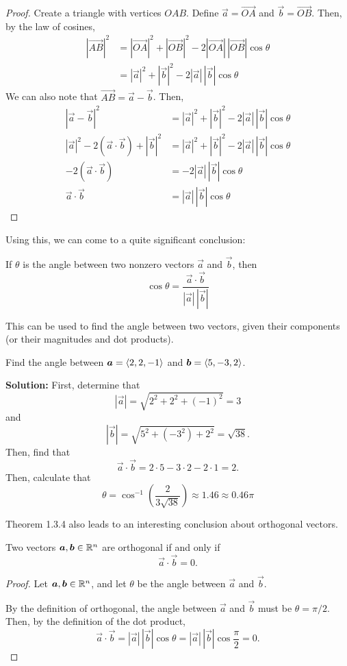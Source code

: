 \begin{proof}
    Create a triangle with vertices \(OAB\). Define \(\vec a = \overrightarrow{OA}\) and \(\vec b = \overrightarrow{OB}\). Then, by the law of cosines,
    \begin{align*}
        |\overrightarrow{AB}|^2 &= |\overrightarrow{OA}|^2+|\overrightarrow{OB}|^2-2|\overrightarrow{OA}|\,|\overrightarrow{OB}|\cos\theta \\
        &= |\vec a|^2 + |\vec b|^2 - 2|\vec a|\,|\vec b|\cos \theta
    \end{align*}
    We can also note that \(\overrightarrow{AB}=\vec a - \vec b\). Then,
    \begin{align*}
        |\vec a - \vec b|^2 &= |\vec a|^2 + |\vec b|^2 - 2|\vec a|\,|\vec b|\cos \theta \\
        |\vec a|^2 -2(\vec a \cdot \vec b)+|\vec b|^2 &= |\vec a|^2 + |\vec b|^2 - 2|\vec a|\,|\vec b|\cos \theta \\
        -2(\vec a \cdot \vec b) &= -2|\vec a|\,|\vec b|\cos \theta \\
        \vec a\cdot \vec b &= |\vec a|\,|\vec b|\cos\theta
    \end{align*}
\end{proof}
Using this, we can come to a quite significant conclusion:
\begin{corollary}
    If \(\theta\) is the angle between two nonzero vectors \(\vec a\) and \(\vec b\), then
    \[\cos \theta = \frac{\vec a \cdot \vec b}{|\vec a|\,|\vec b|}\]
\end{corollary}
This can be used to find the angle between two vectors, given their components (or their magnitudes and dot products).
\begin{example}
    Find the angle between \(\boldsymbol{a} = \left\langle2, 2, -1\right\rangle\) and \(\boldsymbol{b} = \left\langle5, -3, 2\right\rangle\). \par \textbf{Solution:} First, determine that \[|\vec a| = \sqrt{2^2+2^2+(-1)^2}=3\]
    and \[|\vec b| = \sqrt{5^2+(-3^2)+2^2}=\sqrt{38}.\]
    Then, find that \[\vec a \cdot \vec b = 2\cdot 5 - 3\cdot 2-2\cdot 1 = 2.\] Then, calculate that \[\theta = \cos^{-1}\left(\frac{2}{3\sqrt {38}}\right)\approx 1.46 \approx 0.46\pi\]
\end{example}
Theorem 1.3.4 also leads to an interesting conclusion about orthogonal vectors. \begin{theorem}
    Two vectors \(\boldsymbol{a}, \boldsymbol{b} \in \mathbb{R}^n\) are orthogonal if and only if \[\vec a \cdot \vec b = 0.\]
\end{theorem}\begin{proof}
    Let \(\boldsymbol{a}, \boldsymbol{b} \in \mathbb{R}^n\), and let \(\theta\) be the angle between \(\vec a\) and \(\vec b\). \par
    By the definition of orthogonal, the angle between \(\vec a\) and \(\vec b\) must be \(\theta = \pi/2\). Then, by the definition of the dot product,
    \[\vec a \cdot \vec b = |\vec a|\,|\vec b|\cos\theta = |\vec a|\,|\vec b|\cos\frac{\pi}{2}=0.\]
\end{proof}
